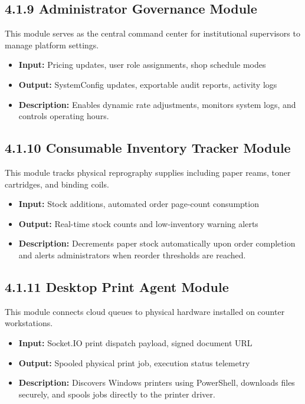 \documentclass[12pt,a4paper]{report}
\begin{document}
\subsection{4.1.9 Administrator Governance Module}
This module serves as the central command center for institutional supervisors to manage platform settings.
\begin{itemize}[leftmargin=0.35in, itemsep=1pt]
  \item \textbf{Input:} Pricing updates, user role assignments, shop schedule modes
  \item \textbf{Output:} SystemConfig updates, exportable audit reports, activity logs
  \item \textbf{Description:} Enables dynamic rate adjustments, monitors system logs, and controls operating hours.
\end{itemize}

\subsection{4.1.10 Consumable Inventory Tracker Module}
This module tracks physical reprography supplies including paper reams, toner cartridges, and binding coils.
\begin{itemize}[leftmargin=0.35in, itemsep=1pt]
  \item \textbf{Input:} Stock additions, automated order page-count consumption
  \item \textbf{Output:} Real-time stock counts and low-inventory warning alerts
  \item \textbf{Description:} Decrements paper stock automatically upon order completion and alerts administrators when reorder thresholds are reached.
\end{itemize}

\subsection{4.1.11 Desktop Print Agent Module}
This module connects cloud queues to physical hardware installed on counter workstations.
\begin{itemize}[leftmargin=0.35in, itemsep=1pt]
  \item \textbf{Input:} Socket.IO print dispatch payload, signed document URL
  \item \textbf{Output:} Spooled physical print job, execution status telemetry
  \item \textbf{Description:} Discovers Windows printers using PowerShell, downloads files securely, and spools jobs directly to the printer driver.
\end{itemize}
\end{document}
